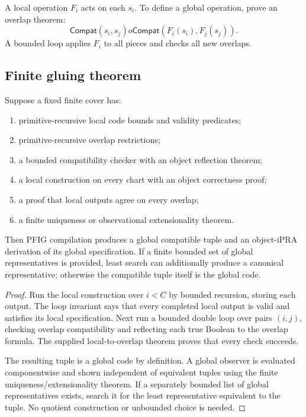 A local operation \(F_i\) acts on each \(s_i\).  To define a global operation, prove an overlap theorem:
\[
 \mathsf{Compat}(s_i,s_j)	o
 \mathsf{Compat}(F_i(s_i),F_j(s_j)).
\]
A bounded loop applies \(F_i\) to all pieces and checks all new overlaps.

\subsection{Finite gluing theorem}

\begin{theorem}
\label{thm:finite-gluing}
Suppose a fixed finite cover has:

\begin{enumerate}
\item primitive-recursive local code bounds and validity predicates;
\item primitive-recursive overlap restrictions;
\item a bounded compatibility checker with an object reflection theorem;
\item a local construction on every chart with an object correctness proof;
\item a proof that local outputs agree on every overlap;
\item a finite uniqueness or observational extensionality theorem.
\end{enumerate}

Then PFIG compilation produces a global compatible tuple and an object-iPRA derivation of its global specification.  If a finite bounded set of global representatives is provided, least search can additionally produce a canonical representative; otherwise the compatible tuple itself is the global code.
\end{theorem}

\begin{proof}
Run the local construction over \(i<C\) by bounded recursion, storing each output.  The loop invariant says that every completed local output is valid and satisfies its local specification.  Next run a bounded double loop over pairs \((i,j)\), checking overlap compatibility and reflecting each true Boolean to the overlap formula.  The supplied local-to-overlap theorem proves that every check succeeds.

The resulting tuple is a global code by definition.  A global observer is evaluated componentwise and shown independent of equivalent tuples using the finite uniqueness/extensionality theorem.  If a separately bounded list of global representatives exists, search it for the least representative equivalent to the tuple.  No quotient construction or unbounded choice is needed.
\end{proof}

